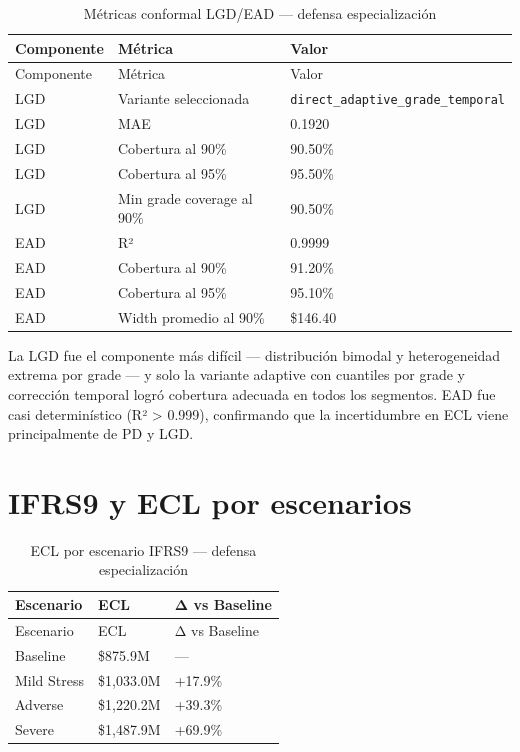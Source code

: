 \documentclass[
  spanish,
  11pt,
  letterpaper,
]{scrbook}
\theoremstyle{plain}
\theoremstyle{remark}
\begin{document}
\begin{longtable}[]{@{}lll@{}}
\caption{Métricas conformal LGD/EAD --- defensa
especialización}\label{tbl-snapshot-lgd-ead}\tabularnewline
\toprule\noalign{}
Componente & Métrica & Valor \\
\midrule\noalign{}
\endfirsthead
\toprule\noalign{}
Componente & Métrica & Valor \\
\midrule\noalign{}
\endhead
\bottomrule\noalign{}
\endlastfoot
LGD & Variante seleccionada &
\texttt{direct\_adaptive\_grade\_temporal} \\
LGD & MAE & 0.1920 \\
LGD & Cobertura al 90\% & 90.50\% \\
LGD & Cobertura al 95\% & 95.50\% \\
LGD & Min grade coverage al 90\% & 90.50\% \\
EAD & R² & 0.9999 \\
EAD & Cobertura al 90\% & 91.20\% \\
EAD & Cobertura al 95\% & 95.10\% \\
EAD & Width promedio al 90\% & \$146.40 \\
\end{longtable}

La LGD fue el componente más difícil --- distribución bimodal y
heterogeneidad extrema por grade --- y solo la variante adaptive con
cuantiles por grade y corrección temporal logró cobertura adecuada en
todos los segmentos. EAD fue casi determinístico (R² \textgreater{}
0.999), confirmando que la incertidumbre en ECL viene principalmente de
PD y LGD.

\section{IFRS9 y ECL por escenarios}\label{ifrs9-y-ecl-por-escenarios}

\begin{longtable}[]{@{}lll@{}}
\caption{ECL por escenario IFRS9 --- defensa
especialización}\label{tbl-snapshot-ecl}\tabularnewline
\toprule\noalign{}
Escenario & ECL & Δ vs Baseline \\
\midrule\noalign{}
\endfirsthead
\toprule\noalign{}
Escenario & ECL & Δ vs Baseline \\
\midrule\noalign{}
\endhead
\bottomrule\noalign{}
\endlastfoot
Baseline & \$875.9M & --- \\
Mild Stress & \$1,033.0M & +17.9\% \\
Adverse & \$1,220.2M & +39.3\% \\
Severe & \$1,487.9M & +69.9\% \\
\end{longtable}
\end{document}
